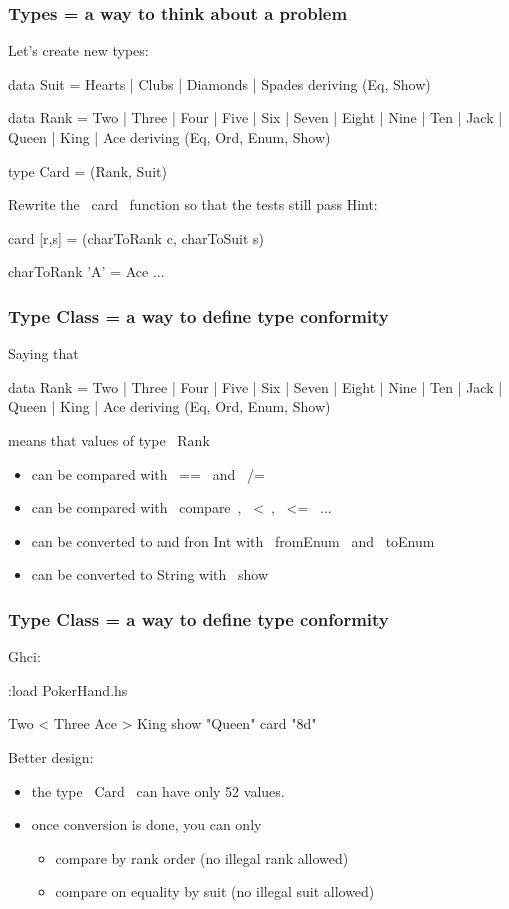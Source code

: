 \documentclass[11pt,xcolor={dvipsnames}]{beamer}
\newcommand{\tc}{\textcolor}
\newcommand{\key}[1]{\tc{orange}{#1}}
\newcommand{\rk}{\enskip{\key{$\hookleftarrow$}}}
\newcommand{\vs}{\vspace{1em}}
\begin{document}
\begin{frame}[fragile]
\frametitle{Types = a way to think about a problem}
Let's create new types:
\begin{haskell}
data Suit = Hearts | Clubs | Diamonds | Spades
    deriving (Eq, Show)

data Rank = Two | Three | Four | Five | Six | Seven | Eight 
          | Nine | Ten | Jack | Queen | King | Ace
    deriving (Eq, Ord, Enum, Show)

type Card = (Rank, Suit)
\end{haskell}
Rewrite the ~card~ function so that the tests still pass
\vs
Hint:
\begin{haskell}
card [r,s] = (charToRank c, charToSuit s)

charToRank 'A' = Ace
...
\end{haskell}
\end{frame}
\begin{frame}[fragile]
\frametitle{Type Class = a way to define type conformity}
Saying that
\begin{haskell}
data Rank = Two | Three | Four | Five | Six | Seven | Eight 
          | Nine | Ten | Jack | Queen | King | Ace
    deriving (Eq, Ord, Enum, Show)
\end{haskell}
means that values of type ~Rank~ 
\begin{itemize}
\item  can be compared with ~==~ and ~/=~ 
\item  can be compared with ~compare~, ~<~, ~<=~ ...
\item  can be converted to and fron Int with ~fromEnum~ and ~toEnum~
\item  can be converted to String with ~show~
\end{itemize}
\end{frame}
\begin{frame}[fragile]
\frametitle{Type Class = a way to define type conformity}
Ghci:
\begin{term}
:load PokerHand.hs\rk

Two < Three\rk
Ace > King\rk
show "Queen"\rk
card "8d"\rk
\end{term}
Better design:
\begin{itemize}
\item  the type ~Card~ can have only 52 values.
\item  once conversion is done, you can only
\begin{itemize}
\item compare by rank order (no illegal rank allowed)
\item compare on equality by suit (no illegal suit allowed)
\end{itemize}
\end{itemize}
\end{frame}
\end{document}
